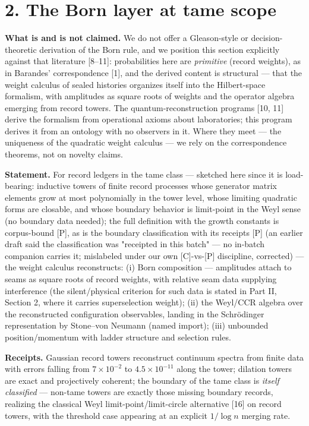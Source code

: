 \documentclass[11pt]{article}
\begin{document}
\section*{2. The Born layer at tame scope}
\textbf{What is and is not claimed.}  We do not offer a Gleason-style or decision-theoretic derivation of the Born rule, and we position this section explicitly against that literature [8–11]: probabilities here are \emph{primitive} (record weights), as in Barandes' correspondence [1], and the derived content is structural — that the weight calculus of sealed histories organizes itself into the Hilbert-space formalism, with amplitudes as square roots of weights and the operator algebra emerging from record towers.  The quantum-reconstruction programs [10, 11] derive the formalism from operational axioms about laboratories; this program derives it from an ontology with no observers in it.  Where they meet — the uniqueness of the quadratic weight calculus — we rely on the correspondence theorems, not on novelty claims.

\textbf{Statement.}  For record ledgers in the tame class — sketched here since it is load-bearing: inductive towers of finite record processes whose generator matrix elements grow at most polynomially in the tower level, whose limiting quadratic forms are closable, and whose boundary behavior is limit-point in the Weyl sense (no boundary data needed); the full definition with the growth constants is corpus-bound [P], as is the boundary classification with its receipts [P] (an earlier draft said the classification was "receipted in this batch" — no in-batch companion carries it; mislabeled under our own [C]-vs-[P] discipline, corrected) — the weight calculus reconstructs: (i) Born composition — amplitudes attach to seams as square roots of record weights, with relative seam data supplying interference (the silent/physical criterion for such data is stated in Part II, Section 2, where it carries superselection weight); (ii) the Weyl/CCR algebra over the reconstructed configuration observables, landing in the Schrödinger representation by Stone–von Neumann (named import); (iii) unbounded position/momentum with ladder structure and selection rules.

\textbf{Receipts.}  Gaussian record towers reconstruct continuum spectra from finite data with errors falling from $7\times 10^{-2}$ to $4.5\times 10^{-11}$ along the tower; dilation towers are exact and projectively coherent; the boundary of the tame class is \emph{itself classified} — non-tame towers are exactly those missing boundary records, realizing the classical Weyl limit-point/limit-circle alternative [16] on record towers, with the threshold case appearing at an explicit $1/\log n$ merging rate.
\end{document}
